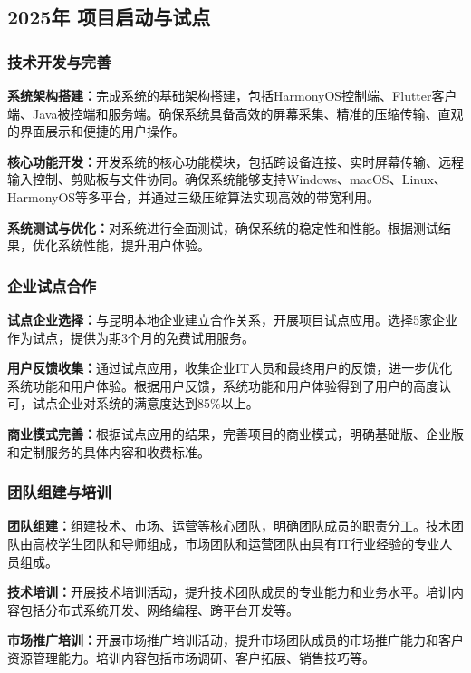 \documentclass[12pt,a4paper]{article}
\begin{document}
\subsection{2025年 项目启动与试点}

\subsubsection{技术开发与完善}
\textbf{系统架构搭建：}完成系统的基础架构搭建，包括HarmonyOS控制端、Flutter客户端、Java被控端和服务端。确保系统具备高效的屏幕采集、精准的压缩传输、直观的界面展示和便捷的用户操作。

\textbf{核心功能开发：}开发系统的核心功能模块，包括跨设备连接、实时屏幕传输、远程输入控制、剪贴板与文件协同。确保系统能够支持Windows、macOS、Linux、HarmonyOS等多平台，并通过三级压缩算法实现高效的带宽利用。

\textbf{系统测试与优化：}对系统进行全面测试，确保系统的稳定性和性能。根据测试结果，优化系统性能，提升用户体验。

\subsubsection{企业试点合作}
\textbf{试点企业选择：}与昆明本地企业建立合作关系，开展项目试点应用。选择5家企业作为试点，提供为期3个月的免费试用服务。

\textbf{用户反馈收集：}通过试点应用，收集企业IT人员和最终用户的反馈，进一步优化系统功能和用户体验。根据用户反馈，系统功能和用户体验得到了用户的高度认可，试点企业对系统的满意度达到85\%以上。

\textbf{商业模式完善：}根据试点应用的结果，完善项目的商业模式，明确基础版、企业版和定制服务的具体内容和收费标准。

\subsubsection{团队组建与培训}
\textbf{团队组建：}组建技术、市场、运营等核心团队，明确团队成员的职责分工。技术团队由高校学生团队和导师组成，市场团队和运营团队由具有IT行业经验的专业人员组成。

\textbf{技术培训：}开展技术培训活动，提升技术团队成员的专业能力和业务水平。培训内容包括分布式系统开发、网络编程、跨平台开发等。

\textbf{市场推广培训：}开展市场推广培训活动，提升市场团队成员的市场推广能力和客户资源管理能力。培训内容包括市场调研、客户拓展、销售技巧等。
\end{document}

